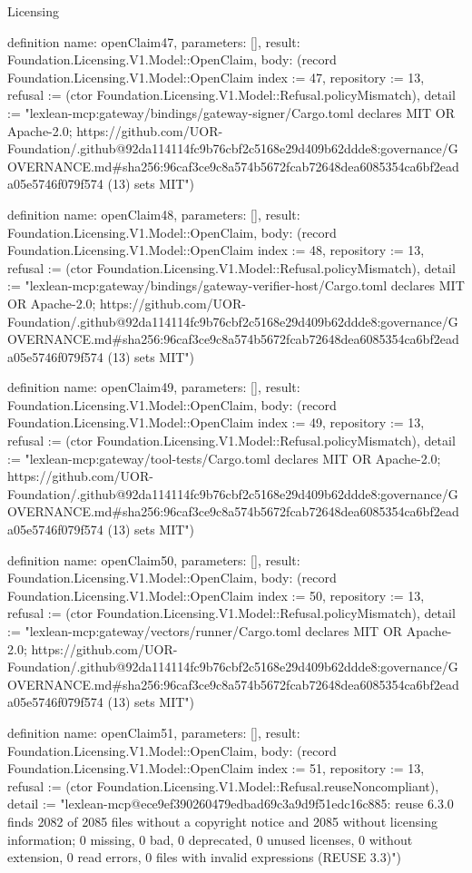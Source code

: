 \begin{lexlean}{Licensing}
\begin{semanticmodule}
definition{
  name: openClaim47,
  parameters: [],
  result: Foundation.Licensing.V1.Model::OpenClaim,
  body: (record Foundation.Licensing.V1.Model::OpenClaim {index := 47, repository := 13, refusal := (ctor Foundation.Licensing.V1.Model::Refusal.policyMismatch), detail := "lexlean-mcp:gateway/bindings/gateway-signer/Cargo.toml declares MIT OR Apache-2.0; https://github.com/UOR-Foundation/.github@92da114114fc9b76cbf2c5168e29d409b62ddde8:governance/GOVERNANCE.md#sha256:96caf3ce9c8a574b5672fcab72648dea6085354ca6bf2eada05e5746f079f574 (13) sets MIT"})
}

definition{
  name: openClaim48,
  parameters: [],
  result: Foundation.Licensing.V1.Model::OpenClaim,
  body: (record Foundation.Licensing.V1.Model::OpenClaim {index := 48, repository := 13, refusal := (ctor Foundation.Licensing.V1.Model::Refusal.policyMismatch), detail := "lexlean-mcp:gateway/bindings/gateway-verifier-host/Cargo.toml declares MIT OR Apache-2.0; https://github.com/UOR-Foundation/.github@92da114114fc9b76cbf2c5168e29d409b62ddde8:governance/GOVERNANCE.md#sha256:96caf3ce9c8a574b5672fcab72648dea6085354ca6bf2eada05e5746f079f574 (13) sets MIT"})
}

definition{
  name: openClaim49,
  parameters: [],
  result: Foundation.Licensing.V1.Model::OpenClaim,
  body: (record Foundation.Licensing.V1.Model::OpenClaim {index := 49, repository := 13, refusal := (ctor Foundation.Licensing.V1.Model::Refusal.policyMismatch), detail := "lexlean-mcp:gateway/tool-tests/Cargo.toml declares MIT OR Apache-2.0; https://github.com/UOR-Foundation/.github@92da114114fc9b76cbf2c5168e29d409b62ddde8:governance/GOVERNANCE.md#sha256:96caf3ce9c8a574b5672fcab72648dea6085354ca6bf2eada05e5746f079f574 (13) sets MIT"})
}

definition{
  name: openClaim50,
  parameters: [],
  result: Foundation.Licensing.V1.Model::OpenClaim,
  body: (record Foundation.Licensing.V1.Model::OpenClaim {index := 50, repository := 13, refusal := (ctor Foundation.Licensing.V1.Model::Refusal.policyMismatch), detail := "lexlean-mcp:gateway/vectors/runner/Cargo.toml declares MIT OR Apache-2.0; https://github.com/UOR-Foundation/.github@92da114114fc9b76cbf2c5168e29d409b62ddde8:governance/GOVERNANCE.md#sha256:96caf3ce9c8a574b5672fcab72648dea6085354ca6bf2eada05e5746f079f574 (13) sets MIT"})
}

definition{
  name: openClaim51,
  parameters: [],
  result: Foundation.Licensing.V1.Model::OpenClaim,
  body: (record Foundation.Licensing.V1.Model::OpenClaim {index := 51, repository := 13, refusal := (ctor Foundation.Licensing.V1.Model::Refusal.reuseNoncompliant), detail := "lexlean-mcp@ece9ef390260479edbad69c3a9d9f51edc16c885: reuse 6.3.0 finds 2082 of 2085 files without a copyright notice and 2085 without licensing information; 0 missing, 0 bad, 0 deprecated, 0 unused licenses, 0 without extension, 0 read errors, 0 files with invalid expressions (REUSE 3.3)"})
}


\end{semanticmodule}
\end{lexlean}
